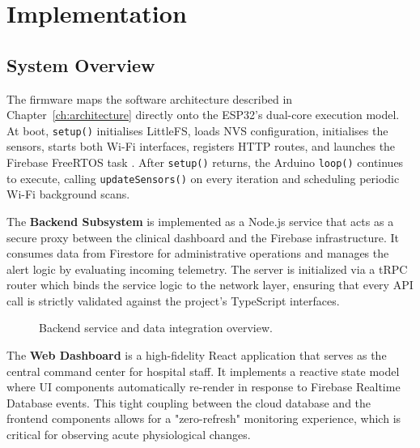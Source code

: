 
\chapter{Implementation}
\label{ch:implementation}

\section{System Overview}

The firmware maps the software architecture described in
Chapter~\ref{ch:architecture} directly onto the ESP32's dual-core execution model.
At boot, \texttt{setup()} initialises LittleFS, loads NVS configuration, initialises the sensors, starts
both Wi-Fi interfaces, registers HTTP routes, and launches the Firebase FreeRTOS task .
After \texttt{setup()} returns, the Arduino \texttt{loop()} continues to execute, calling \texttt{updateSensors()} on every iteration and scheduling periodic
Wi-Fi background scans.

The \textbf{Backend Subsystem} is implemented as a Node.js service that acts as a secure proxy between the clinical dashboard and the Firebase infrastructure. It consumes data from Firestore for administrative operations and manages the alert logic by evaluating incoming telemetry. The server is initialized via a tRPC router which binds the service logic to the network layer, ensuring that every API call is strictly validated against the project's TypeScript interfaces.

\begin{figure}[H]
    \centering
    \caption{Backend service and data integration overview.}
    \label{fig:backend_overview}
\end{figure}

The \textbf{Web Dashboard} is a high-fidelity React application that serves as the central command center for hospital staff. It implements a reactive state model where UI components automatically re-render in response to Firebase Realtime Database events. This tight coupling between the cloud database and the frontend components allows for a "zero-refresh" monitoring experience, which is critical for observing acute physiological changes.

